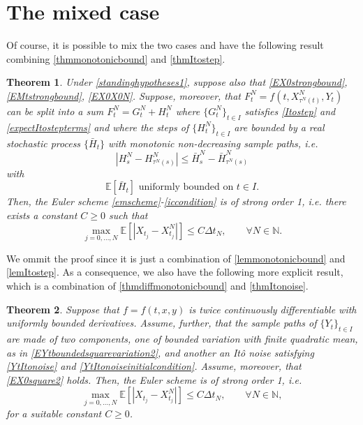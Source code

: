 \documentclass[reqno,12pt]{amsart}
\theoremstyle{plain}%
\newtheorem{thm}{Theorem}[section]
\theoremstyle{definition}
\begin{document}
\section{The mixed case}
\label{secmixed}

Of course, it is possible to mix the two cases and have the following result combining \cref{thmmonotonicbound} and \cref{thmItostep}.

\begin{thm}
    \label{thmmixedcase}
    Under \cref{standinghypotheses1}, suppose also that
    \eqref{EX0strongbound}, \eqref{EMtstrongbound}, \eqref{EX0X0N}. Suppose, moreover, that $F_t^N = f(t, X_{\tau^N(t)}^N, Y_t)$ can be split into a sum $F_t^N = G_t^N + H_t^N$ where $\{G_t^N\}_{t\in I}$ satisfies \eqref{Itostep} and \eqref{expectItostepterms} and where the steps of $\{H_t^N\}_{t\in I}$ are bounded by a real stochastic process $\{\bar H_t\}$ with monotonic non-decreasing sample paths, i.e.
    \begin{equation}
        \label{stepHbound}
        |H_s^N - H_{\tau^N(s)}^N| \leq \bar H_s^N - \bar H_{\tau^N(s)}^N
    \end{equation}
    with
    \begin{equation}
      \label{expectstepHmonotonic}
      \mathbb{E}[\bar H_t] \textrm{ uniformly bounded on } t\in I.
    \end{equation}
    Then, the Euler scheme \eqref{emscheme}-\eqref{iccondition} is of strong order 1, i.e. there exists a constant $C\geq 0$ such that
    \begin{equation}
      \label{thmmixedtrongordernew}
        \max_{j=0, \ldots, N}\mathbb{E}\left[ \left| X_{t_j} - X_{t_j}^N \right| \right] \leq C \Delta t_N, \qquad \forall N \in \mathbb{N}.
    \end{equation}
\end{thm}

We ommit the proof since it is just a combination of \cref{lemmonotonicbound} and \cref{lemItostep}. As a consequence, we also have the following more explicit result, which is a combination of \cref{thmdiffmonotonicbound} and \cref{thmItonoise}.

\begin{thm}
    \label{thmmixedcasepractical}
    Suppose that $f=f(t, x, y)$ is twice continuously differentiable with uniformly bounded derivatives. Assume, further, that the sample paths of $\{Y_t\}_{t\in I}$ are made of two components, one of bounded variation with finite quadratic mean, as in \eqref{EYtboundedsquarevariation2}, and another an It\^o noise satisfying \eqref{YtItonoise} and \eqref{YtItonoiseinitialcondition}. Assume, moreover, that \eqref{EX0square2} holds. Then, the Euler scheme is of strong order 1, i.e.
    \begin{equation}
        \max_{j=0, \ldots, N}\mathbb{E}\left[ \left| X_{t_j} - X_{t_j}^N \right| \right] \leq C \Delta t_N, \qquad \forall N \in \mathbb{N},
    \end{equation}
    for a suitable constant $C \geq 0$.
\end{thm}
\end{document}
